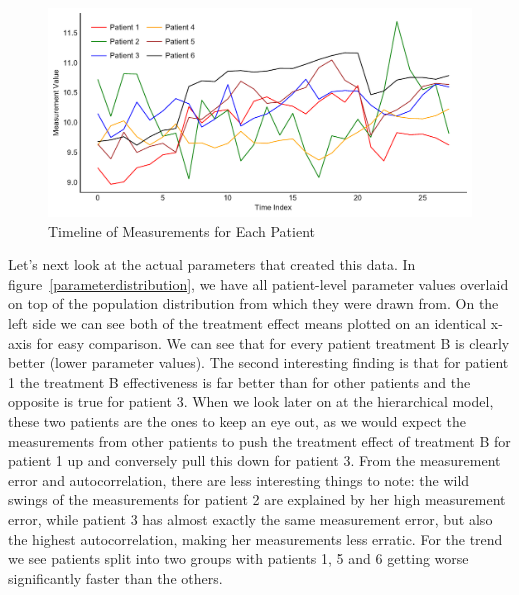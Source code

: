 \documentclass[12pt,a4paper,leqno]{report}
\theoremstyle{plain}
\theoremstyle{definition}
\theoremstyle{remark}
\begin{document}
\begin{figure}[H]
    \caption{Timeline of Measurements for Each Patient}\label{measurementtimeline}
    \bigskip
    \includegraphics[width=\textwidth,height=\textheight,keepaspectratio]{measurements_timeline.pdf}
\end{figure}

Let's next look at the actual parameters that created this data.
In figure\ \ref{parameterdistribution}, we have all patient-level parameter values
overlaid on top of the population
distribution from which they were drawn from. On the left side we can see both of the
treatment effect means plotted on an identical x-axis for easy comparison.
We can see that for every patient treatment B is clearly
better (lower parameter values). The second interesting finding is that for patient
1 the treatment B effectiveness is far better than for other patients and the opposite
is true for patient 3. When we look later on at
the hierarchical model, these two patients are the ones to keep an eye out, as we would
expect the measurements from other patients to push the treatment effect of
treatment B for patient 1 up and conversely pull this down for patient
3. From the measurement error and autocorrelation, there are less interesting things to
note: the wild swings of the measurements for patient 2
are explained by her high measurement error, while patient 3 has almost exactly the same
measurement error, but also the highest autocorrelation, making her measurements less
erratic. For the trend we see patients split into two groups with patients 1, 5 and 6 getting
worse significantly faster than the others.
\end{document}
